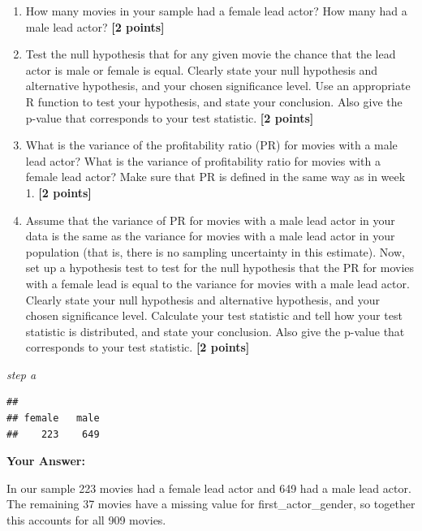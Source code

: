 \documentclass[
]{article}
\newenvironment{Shaded}{\begin{snugshade}}{\end{snugshade}}
\newcommand{\FunctionTok}[1]{\textcolor[rgb]{0.13,0.29,0.53}{\textbf{#1}}}
\newcommand{\NormalTok}[1]{#1}
\newcommand{\SpecialCharTok}[1]{\textcolor[rgb]{0.81,0.36,0.00}{\textbf{#1}}}
\providecommand{\tightlist}{%
  \setlength{\itemsep}{0pt}\setlength{\parskip}{0pt}}
\begin{document}
\begin{enumerate}
\def\labelenumi{\alph{enumi}.}
\tightlist
\item
  How many movies in your sample had a female lead actor? How many had a
  male lead actor? \textbf{[2 points]}
\item
  Test the null hypothesis that for any given movie the chance that the
  lead actor is male or female is equal. Clearly state your null
  hypothesis and alternative hypothesis, and your chosen significance
  level. Use an appropriate R function to test your hypothesis, and
  state your conclusion. Also give the p-value that corresponds to your
  test statistic. \textbf{[2 points]}
\item
  What is the variance of the profitability ratio (PR) for movies with a
  male lead actor? What is the variance of profitability ratio for
  movies with a female lead actor? Make sure that PR is defined in the
  same way as in week 1. \textbf{[2 points]}
\item
  Assume that the variance of PR for movies with a male lead actor in
  your data is the same as the variance for movies with a male lead
  actor in your population (that is, there is no sampling uncertainty in
  this estimate). Now, set up a hypothesis test to test for the null
  hypothesis that the PR for movies with a female lead is equal to the
  variance for movies with a male lead actor. Clearly state your null
  hypothesis and alternative hypothesis, and your chosen significance
  level. Calculate your test statistic and tell how your test statistic
  is distributed, and state your conclusion. Also give the p-value that
  corresponds to your test statistic. \textbf{[2 points]}
\end{enumerate}

\emph{step a}

\begin{Shaded}
\end{Shaded}

\begin{verbatim}
## 
## female   male 
##    223    649
\end{verbatim}

\textbf{Your Answer:}

In our sample 223 movies had a female lead actor and 649 had a male lead
actor. The remaining 37 movies have a missing value for
first\_actor\_gender, so together this accounts for all 909 movies.
\end{document}
